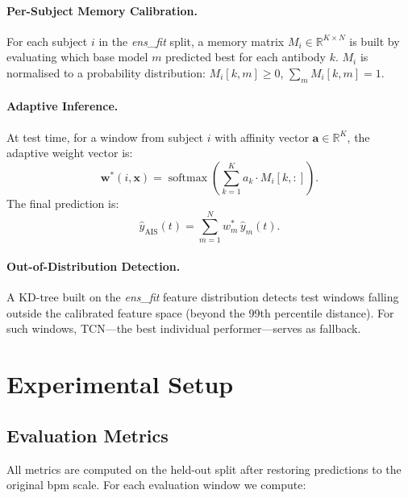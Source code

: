 \documentclass[11pt,a4paper]{article}
\begin{document}
\paragraph{Per-Subject Memory Calibration.}
For each subject $i$ in the \textit{ens\_fit} split, a memory matrix
$M_i\in\mathbb{R}^{K\times N}$ is built by evaluating which base model $m$
predicted best for each antibody $k$.  $M_i$ is normalised to a probability
distribution: $M_i[k,m]\geq0$, $\sum_m M_i[k,m]=1$.

\paragraph{Adaptive Inference.}
At test time, for a window from subject $i$ with affinity vector
$\mathbf{a}\in\mathbb{R}^K$, the adaptive weight vector is:
\begin{equation}
  \mathbf{w}^*(i,\mathbf{x})
    = \operatorname{softmax}\!\left(\sum_{k=1}^{K} a_k \cdot M_i[k,:]\right).
\end{equation}
The final prediction is:
\begin{equation}
  \hat{y}_{\mathrm{AIS}}(t) = \sum_{m=1}^{N} w^*_m\, \hat{y}_m(t).
\end{equation}

\paragraph{Out-of-Distribution Detection.}
A KD-tree built on the \textit{ens\_fit} feature distribution detects test
windows falling outside the calibrated feature space (beyond the 99th
percentile distance).  For such windows, TCN—the best individual
performer—serves as fallback.

\section{Experimental Setup}
\label{sec:setup}

\subsection{Evaluation Metrics}

All metrics are computed on the held-out split after restoring predictions to
the original bpm scale.  For each evaluation window we compute:
\end{document}
